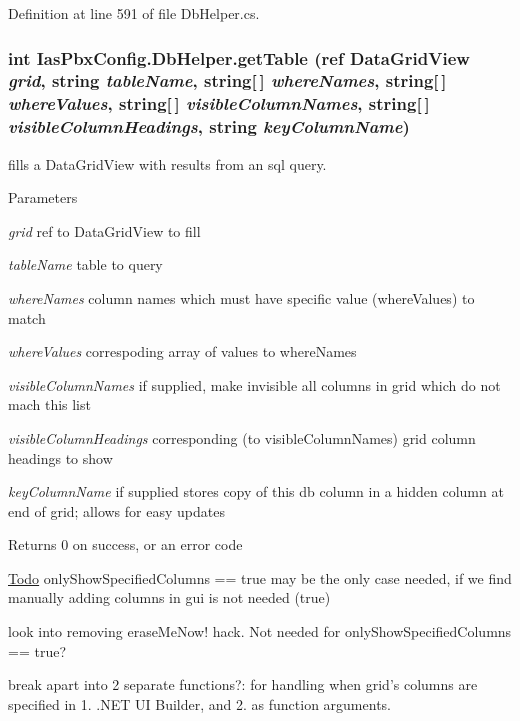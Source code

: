 Definition at line 591 of file DbHelper.cs.\hypertarget{class_ias_pbx_config_1_1_db_helper_a10079976d673fae758ec466ffcc1ee11}{
\subsubsection[{getTable}]{\setlength{\rightskip}{0pt plus 5cm}int IasPbxConfig.DbHelper.getTable (ref DataGridView {\em grid}, \/  string {\em tableName}, \/  string\mbox{[}$\,$\mbox{]} {\em whereNames}, \/  string\mbox{[}$\,$\mbox{]} {\em whereValues}, \/  string\mbox{[}$\,$\mbox{]} {\em visibleColumnNames}, \/  string\mbox{[}$\,$\mbox{]} {\em visibleColumnHeadings}, \/  string {\em keyColumnName})}}
\label{class_ias_pbx_config_1_1_db_helper_a10079976d673fae758ec466ffcc1ee11}


fills a DataGridView with results from an sql query. 
\begin{DoxyParams}{Parameters}
\item[{\em grid}]ref to DataGridView to fill \item[{\em tableName}]table to query \item[{\em whereNames}]column names which must have specific value (whereValues) to match \item[{\em whereValues}]correspoding array of values to whereNames \item[{\em visibleColumnNames}]if supplied, make invisible all columns in grid which do not mach this list \item[{\em visibleColumnHeadings}]corresponding (to visibleColumnNames) grid column headings to show \item[{\em keyColumnName}]if supplied stores copy of this db column in a hidden column at end of grid; allows for easy updates \end{DoxyParams}
\begin{DoxyReturn}{Returns}
0 on success, or an error code
\end{DoxyReturn}
\begin{Desc}
\item[\hyperlink{todo__todo000016}{Todo}]onlyShowSpecifiedColumns == true may be the only case needed, if we find manually adding columns in gui is not needed (true) 

look into removing eraseMeNow! hack. Not needed for onlyShowSpecifiedColumns == true? 

break apart into 2 separate functions?: for handling when grid's columns are specified in 1. .NET UI Builder, and 2. as function arguments. \end{Desc}


